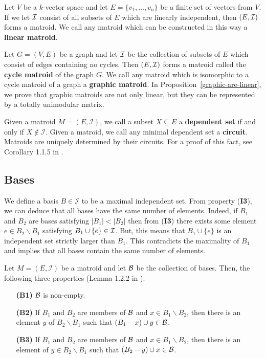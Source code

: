 \documentclass{puthesis-UG}
\begin{document}
\begin{example}  \label{linear-matroid}
	Let $V$ be a $k$-vector space and let $E = \{v_1, \ldots, v_n\}$ be a finite set of vectors from $V$. If we let $\mathcal{I}$ consist of all subsets of $E$ which are linearly independent, then $(E, \mathcal{I})$ forms a matroid. We call any matroid which can be constructed in this way a \textbf{linear matroid}. 
\end{example}

\begin{example} 
	Let $G = (V, E)$ be a graph and let $\mathcal{I}$ be the collection of subsets of $E$ which consist of edges containing no cycles. Then $(E, \mathcal{I})$ forms a matroid called the \textbf{cycle matroid} of the graph $G$. We call any matroid which is isomorphic to a cycle matroid of a graph a \textbf{graphic matroid}. In Proposition~\ref{graphic-are-linear}, we prove that graphic matroids are not only linear, but they can be represented by a totally unimodular matrix. 
\end{example}

\begin{prop} \label{graphic-are-linear}
	
\end{prop}

Given a matroid $M = (E, \mathcal{I})$, we call a subset $X \subseteq E$ a \textbf{dependent set} if and only if $X \notin \mathcal{I}$. Given a matroid, we call any minimal dependent set a \textbf{circuit}. Matroids are uniquely determined by their circuits. For a proof of this fact, see Corollary 1.1.5 in \cite{10.5555/1197093}.

\subsection{Bases}
We define a basis $B \in \mathcal{I}$ to be a maximal independent set. From property (\textbf{I3}), we can deduce that all bases have the same number of elements. Indeed, if $B_1$ and $B_2$ are bases satisfying $|B_1| < |B_2|$ then from (\textbf{I3}) there exists some element $e \in B_2 \backslash B_1$ satisfying $B_1 \cup \{e\} \in \mathcal{I}$. But, this means that $B_1 \cup \{e\}$ is an independent set strictly larger than $B_1$. This contradicts the maximality of $B_1$ and implies that all bases contain the same number of elements. 
\begin{defn}
	Let $M = (E, \mathcal{I})$ be a matroid and let $\mathcal{B}$ be the collection of bases. Then, the following three properties (Lemma 1.2.2 in \cite{10.5555/1197093}):
	\begin{enumerate}
		\item[\textbf{(B1)}] $\mathcal{B}$ is non-empty.
		\item[\textbf{(B2)}] If $B_1$ and $B_2$ are members of $\mathcal{B}$ and $x \in B_1 \backslash B_2$, then there is an element $y$ of $B_2 \backslash B_1$ such that $(B_1 - x) \cup y \in \mathcal{B}$. 
		\item[\textbf{(B3)}] If $B_1$ and $B_2$ are members of $\mathcal{B}$ and $x \in B_1 \backslash B_2$, then there is an element of $y \in B_2 \backslash B_1$ such that $(B_2 - y) \cup x \in \mathcal{B}$. 
	\end{enumerate}
\end{defn}
\end{document}
